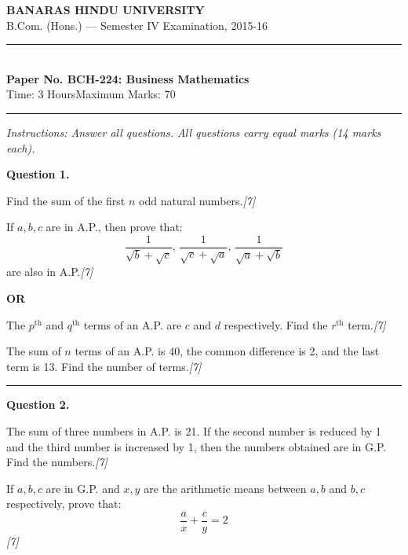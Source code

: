 \documentclass[11pt,a4paper]{article}
\newcommand{\pts}[1]{\hfill   \textit{[#1]}}
\begin{document}
\begin{center}
  {\large\bfseries BANARAS HINDU UNIVERSITY}\\[2pt]
  {\normalsize B.Com. (Hons.) --- Semester IV Examination, 2015-16}\\[6pt]
  \rule{0.8\linewidth}{0.5pt}\\[6pt]
  {\large\bfseries Paper No. BCH-224: Business Mathematics}\\[4pt]
  {\normalsize Time: 3 Hours\hfill Maximum Marks: 70}
\end{center}

\rule{\linewidth}{0.4pt}

\smallskip



\noindent   \textit{Instructions: Answer all questions. All questions carry equal marks (14 marks each).}

\bigskip




\noindent   \textbf{Question 1.}

\begin{parts}
  \item Find the sum of the first $n$ odd natural numbers.\pts{7}
  \item If $a, b, c$ are in A.P., then prove that:
  \[
  \frac{1}{\sqrt{b}+\sqrt{c}}, \, \frac{1}{\sqrt{c}+\sqrt{a}}, \, \frac{1}{\sqrt{a}+\sqrt{b}}
  \]
  are also in A.P.\pts{7}
\end{parts}

\centerline{   \textbf{OR}}


\begin{parts}
  \item The $p^{ \text{th}}$ and $q^{ \text{th}}$ terms of an A.P. are $c$ and $d$ respectively. Find the $r^{ \text{th}}$ term.\pts{7}
  \item The sum of $n$ terms of an A.P. is 40, the common difference is 2, and the last term is 13. Find the number of terms.\pts{7}
\end{parts}

\medskip\rule{\linewidth}{0.2pt}




\noindent   \textbf{Question 2.}

\begin{parts}
  \item The sum of three numbers in A.P. is 21. If the second number is reduced by 1 and the third number is increased by 1, then the numbers obtained are in G.P. Find the numbers.\pts{7}
  \item If $a, b, c$ are in G.P. and $x, y$ are the arithmetic means between $a, b$ and $b, c$ respectively, prove that:
  \[
  \frac{a}{x} + \frac{c}{y} = 2
  \]\pts{7}
\end{parts}
\end{document}
